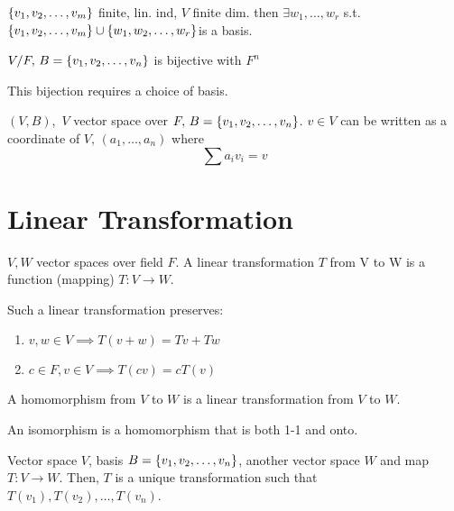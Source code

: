 \begin{corollary} 
	$\{v_1,v_2,\hdots,v_m\}$ finite, lin. ind, $V$ finite dim. then $\exists w_1,\hdots,w_r$ s.t. $\{v_1,v_2,\hdots,v_m\} \cup \{w_1,w_2,\hdots,w_r\}$is a basis.
\end{corollary}

\begin{lemma} 
	$V / F ,\, B=\{v_1,v_2,\hdots,v_n\}$ is bijective with $F^n$
\end{lemma}

This bijection requires a choice of basis.

\begin{definition} 
	$(V,B)$,\, $V$ vector space over $F,\, B=\{v_1,v_2,\hdots,v_n\}$. $v\in V$ can be written as a coordinate of $V,\,(a_1,\hdots,a_n)$ where
	\[\sum a_iv_i = v\]
\end{definition}

\section{Linear Transformation}

\begin{definition} 
	$V,W$ vector spaces over field $F$. A linear transformation $T$ from V to W is a function (mapping) $T:V \rightarrow W$.

	Such a linear transformation preserves:
	\begin{enumerate} 
		\item $v,w \in V \implies T(v+w) = Tv + Tw$
		\item $c\in F,v\in V \implies T(cv) = cT(v)$
	\end{enumerate}
\end{definition}

\begin{definition} 
	A homomorphism from $V$ to $W$ is a linear transformation from $V$ to $W$.
\end{definition}

\begin{definition} 
	An isomorphism is a homomorphism that is both 1-1 and onto.
\end{definition}

\begin{lemma} 
	Vector space $V$, basis $B=\{v_1,v_2,\hdots,v_n\}$, another vector space $W$ and map $T:V\rightarrow W$. Then, $T$ is a unique transformation such that $T(v_1),T(v_2), \hdots,T(v_n)$.
\end{lemma}